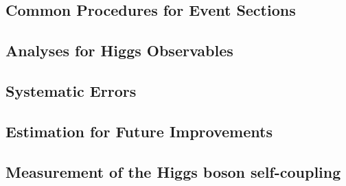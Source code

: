 


\subsection{Common Procedures for Event Sections}
\label{subsec:higgs_common}


\subsection{Analyses for Higgs Observables}
\label{subsec:higgs_ana}


% 

% 

\subsection{Systematic Errors}
\label{subsec:higgs_syst}



\subsection{Estimation for Future Improvements}
\label{subsec:higgs_improve}


\subsection{Measurement of the Higgs boson self-coupling}
\label{subsec:higgsself}

